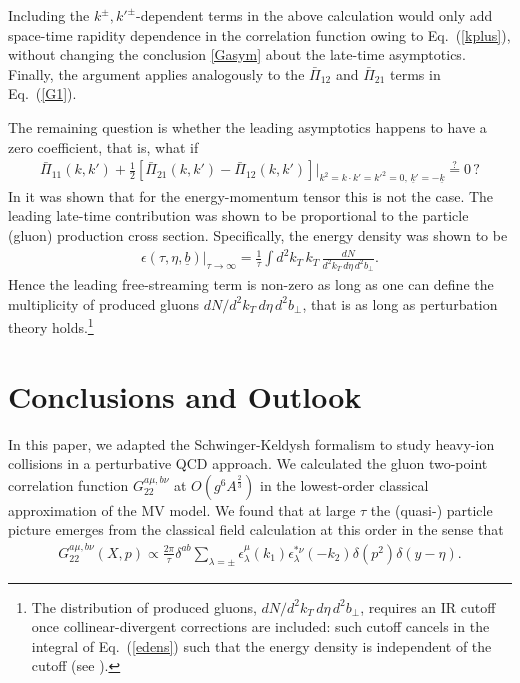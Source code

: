 \documentclass[onecolumn,showpacs,nobibnotes,nofootinbib,12pt,aps,prd,showpacs,notitlepage,nofootinbib,preprintnumbers,amsmath,amssymb]{article}
\def\eq#1{{Eq.~(\ref{#1})}}
\newcommand{\un}[1]{\underline{#1}}
\begin{document}
Including the $k^\pm, k'^\pm$-dependent terms in the above calculation
would only add space-time rapidity dependence in the correlation
function owing to \eq{kplus}, without changing the conclusion
\eqref{Gasym} about the late-time asymptotics. Finally, the argument
applies analogously to the ${\bar \Pi}_{12}$ and ${\bar \Pi}_{21}$
terms in \eq{G1}.

The remaining question is whether the leading asymptotics happens to
have a zero coefficient, that is, what if
\begin{align}
  {\bar \Pi}_{11} (k,k') + \frac{1}{2} \left[ {\bar
      \Pi}_{21} (k,k') - {\bar \Pi}_{12} (k,k') \right] \Bigg|_{k^2 =
    k \cdot k' = k'^{2} =0, \, \un{k}' = - \un{k}} \overset{?}{=} 0 \,
  ?
\end{align} 
In \cite{Kovchegov:2005ss} it was shown that for the energy-momentum
tensor this is not the case. The leading late-time contribution was
shown to be proportional to the particle (gluon) production cross
section. Specifically, the energy density was shown to be
\begin{align}\label{edens}
  \epsilon (\tau, \eta, \un{b}) \Bigg|_{\tau \to \infty} =
  \frac{1}{\tau} \int d^2 k_T \, k_T \, \frac{dN}{d^2 k_T \, d \eta \,
    d^2 b_\perp}.
\end{align}
Hence the leading free-streaming term is non-zero as long as one can
define the multiplicity of produced gluons $dN/d^2 k_T \, d \eta \,
d^2 b_\perp$, that is as long as perturbation theory
holds.\footnote{The distribution of produced gluons, $dN/d^2 k_T \, d
  \eta \, d^2 b_\perp$, requires an IR cutoff once collinear-divergent
  corrections are included: such cutoff cancels in the integral of
  \eq{edens} such that the energy density is independent of the cutoff
  (see \cite{Kovchegov:2007vf}).}



\section{Conclusions and Outlook}
\label{sec:disc}

In this paper, we adapted the Schwinger-Keldysh formalism to study
heavy-ion collisions in a perturbative QCD approach. We calculated the
gluon two-point correlation function $G_{22}^{a\mu,b\nu}$ at $O(g^{6}
A^{\frac{2}{3}})$ in the lowest-order classical approximation of the
MV model. We found that at large $\tau$ the (quasi-) particle picture
emerges from the classical field calculation at this order in the
sense that
\begin{align}
  G_{22}^{a\mu,b\nu}(X,p)\propto
  \frac{2\pi}{\tau}\delta^{ab}\sum\limits_{\lambda=\pm}\epsilon_\lambda^\mu(k_1)
  \epsilon_{\lambda}^{*\nu}(-k_2)\delta(p^2)\delta(y-\eta).\label{summary01}
\end{align}
\end{document}
